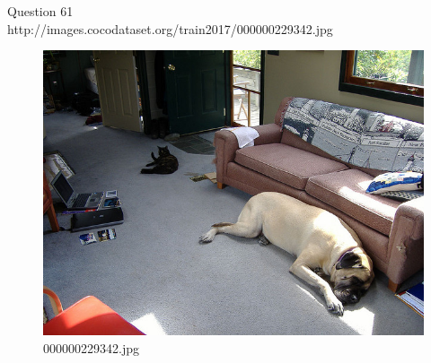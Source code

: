 Question 61\\
http://images.cocodataset.org/train2017/000000229342.jpg
\begin{figure}[h]
    \centering
    \includegraphics[width=0.8\linewidth]{../image set/hard/000000229342.jpg}
    \caption{000000229342.jpg}
\end{figure}
